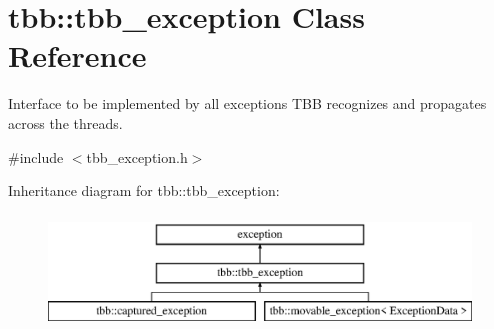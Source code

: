 \hypertarget{classtbb_1_1tbb__exception}{}\section{tbb\+:\+:tbb\+\_\+exception Class Reference}
\label{classtbb_1_1tbb__exception}


Interface to be implemented by all exceptions T\+B\+B recognizes and propagates across the threads.  




{\ttfamily \#include $<$tbb\+\_\+exception.\+h$>$}

Inheritance diagram for tbb\+:\+:tbb\+\_\+exception\+:\begin{figure}[H]
\begin{center}
\leavevmode
\includegraphics[height=3.000000cm]{classtbb_1_1tbb__exception}
\end{center}
\end{figure}
